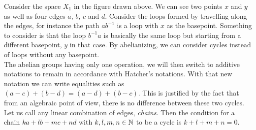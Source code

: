 \documentclass[12pt, a4paper]{article}
\begin{document}
\begin{center}
\end{center}

Consider the space $X_1$ in the figure drawn above. We can see two points $x$ and $y$ as well as four edges $a$, $b$, $c$ and $d$. Consider the loops formed by travelling along the edges, for instance the path $ab^{-1}$ is a loop with $x$ as the basepoint. Something to consider is that the loop $b^{-1}a$ is basically the same loop but starting from a different basepoint, $y$ in that case. By abelianizing, we can consider cycles instead of loops without any basepoint.\\

The abelian groups having only one operation, we will then switch to additive notations to remain in accordance with Hatcher's notations. With that new notation we can write equalities such as $(a-c) + (b-d) = (a-d) + (b-c)$. This is justified by the fact that from an algebraic point of view, there is no difference between these two cycles.\\

Let us call any linear combination of edges, \textit{chains}. Then the condition for a chain $ka + lb + mc + nd$ with $k,l,m,n \in \mathbb{N}$ to be a cycle is $k + l + m + n = 0$.\\
\end{document}
